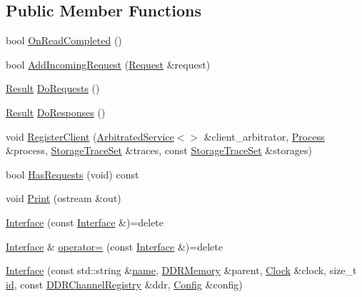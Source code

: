 \subsection*{Public Member Functions}
\begin{DoxyCompactItemize}
\item 
bool \hyperlink{class_simulator_1_1_d_d_r_memory_1_1_interface_aa8e3244f424ea0a40095cba865a778f3}{On\+Read\+Completed} ()
\item 
bool \hyperlink{class_simulator_1_1_d_d_r_memory_1_1_interface_a95c502478d74d4244e87df8104c5aa22}{Add\+Incoming\+Request} (\hyperlink{struct_simulator_1_1_d_d_r_memory_1_1_request}{Request} \&request)
\item 
\hyperlink{namespace_simulator_a4b6b5616e7236c0c131516a441776805}{Result} \hyperlink{class_simulator_1_1_d_d_r_memory_1_1_interface_ad3ff04b3708edc7c863e9181fb1631b0}{Do\+Requests} ()
\item 
\hyperlink{namespace_simulator_a4b6b5616e7236c0c131516a441776805}{Result} \hyperlink{class_simulator_1_1_d_d_r_memory_1_1_interface_a326e2fd1d4c62056a86799405a25004f}{Do\+Responses} ()
\item 
void \hyperlink{class_simulator_1_1_d_d_r_memory_1_1_interface_a4a6a1c248d0607c254f52e5ba8d60db0}{Register\+Client} (\hyperlink{class_simulator_1_1_arbitrated_service}{Arbitrated\+Service}$<$$>$ \&client\+\_\+arbitrator, \hyperlink{class_simulator_1_1_process}{Process} \&process, \hyperlink{class_simulator_1_1_storage_trace_set}{Storage\+Trace\+Set} \&traces, const \hyperlink{class_simulator_1_1_storage_trace_set}{Storage\+Trace\+Set} \&storages)
\item 
bool \hyperlink{class_simulator_1_1_d_d_r_memory_1_1_interface_a40fb1bb69c0d3312847ae5eb1d17af74}{Has\+Requests} (void) const 
\item 
void \hyperlink{class_simulator_1_1_d_d_r_memory_1_1_interface_a939c9cc121824662d58faafd7dd08543}{Print} (ostream \&out)
\item 
\hyperlink{class_simulator_1_1_d_d_r_memory_1_1_interface_a4c06b972e8b3ad3e366d2b8cba8a5d63}{Interface} (const \hyperlink{class_simulator_1_1_d_d_r_memory_1_1_interface}{Interface} \&)=delete
\item 
\hyperlink{class_simulator_1_1_d_d_r_memory_1_1_interface}{Interface} \& \hyperlink{class_simulator_1_1_d_d_r_memory_1_1_interface_a6dcf1eb0d1cc9e4a4d4a8a74fdda706e}{operator=} (const \hyperlink{class_simulator_1_1_d_d_r_memory_1_1_interface}{Interface} \&)=delete
\item 
\hyperlink{class_simulator_1_1_d_d_r_memory_1_1_interface_a66186709c73e6d5588fa278efdd28c18}{Interface} (const std\+::string \&\hyperlink{mtconf_8c_a8f8f80d37794cde9472343e4487ba3eb}{name}, \hyperlink{class_simulator_1_1_d_d_r_memory}{D\+D\+R\+Memory} \&parent, \hyperlink{class_simulator_1_1_clock}{Clock} \&clock, size\+\_\+t \hyperlink{mtconf_8c_aa3185401f04d30bd505daebf48c39cc5}{id}, const \hyperlink{class_simulator_1_1_d_d_r_channel_registry}{D\+D\+R\+Channel\+Registry} \&ddr, \hyperlink{class_config}{Config} \&config)
\end{DoxyCompactItemize}
